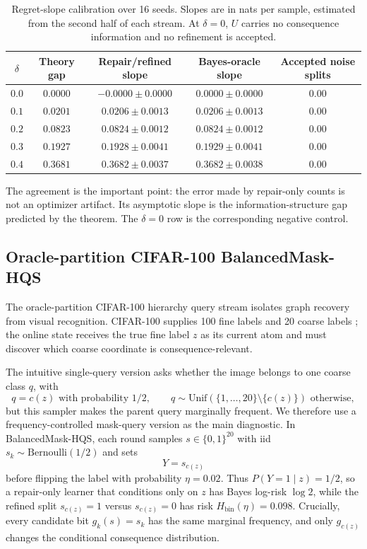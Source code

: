 \begin{table}[t]
\centering
\small
\begin{tabular}{ccccc}
\toprule
$\delta$ & Theory gap & Repair/refined slope & Bayes-oracle slope & Accepted noise splits \\
\midrule
$0.0$ & $0.0000$ & $-0.0000\pm0.0000$ & $0.0000\pm0.0000$ & $0.00$ \\
$0.1$ & $0.0201$ & $0.0206\pm0.0013$ & $0.0206\pm0.0013$ & $0.00$ \\
$0.2$ & $0.0823$ & $0.0824\pm0.0012$ & $0.0824\pm0.0012$ & $0.00$ \\
$0.3$ & $0.1927$ & $0.1928\pm0.0041$ & $0.1929\pm0.0041$ & $0.00$ \\
$0.4$ & $0.3681$ & $0.3682\pm0.0037$ & $0.3682\pm0.0038$ & $0.00$ \\
\bottomrule
\end{tabular}
\caption{Regret-slope calibration over 16 seeds. Slopes are in nats per sample,
estimated from the second half of each stream. At $\delta=0$, $U$ carries no
consequence information and no refinement is accepted.}
\label{tab:bayes-gap-calibration}
\end{table}

The agreement is the important point: the error made by repair-only counts is
not an optimizer artifact. Its asymptotic slope is the information-structure gap
predicted by the theorem. The $\delta=0$ row is the corresponding negative
control.

\subsection{Oracle-partition CIFAR-100 BalancedMask-HQS}
\label{sec:hqs-experiment}

The oracle-partition CIFAR-100 hierarchy query stream isolates graph recovery
from visual recognition. CIFAR-100 supplies 100 fine labels and 20 coarse labels
\citep{krizhevsky2009learning}; the online state receives the true fine label
$z$ as its current atom and must discover which coarse coordinate is
consequence-relevant.

The intuitive single-query version asks whether the image belongs to one coarse
class $q$, with
\[
q=c(z)\text{ with probability }1/2,\qquad
q\sim\mathrm{Unif}(\{1,\ldots,20\}\setminus\{c(z)\})\text{ otherwise},
\]
but this sampler makes the parent query marginally frequent. We therefore use a
frequency-controlled mask-query version as the main diagnostic. In
BalancedMask-HQS, each round samples $s\in\{0,1\}^{20}$ with iid
$s_k\sim\mathrm{Bernoulli}(1/2)$ and sets
\[
Y=s_{c(z)}
\]
before flipping the label with probability $\eta=0.02$. Thus
$P(Y=1\mid z)=1/2$, so a repair-only learner that conditions only on $z$ has
Bayes log-risk $\log 2$, while the refined split $s_{c(z)}=1$ versus
$s_{c(z)}=0$ has risk $H_{\mathrm{bin}}(\eta)=0.098$. Crucially, every
candidate bit $g_k(s)=s_k$ has the same marginal frequency, and only
$g_{c(z)}$ changes the conditional consequence distribution.

